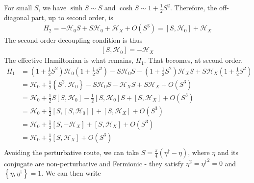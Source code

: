 For small \(S\), we have \(\sinh S \sim S\) and \(\cosh S \sim 1 + \frac{1}{2} S^2\). Therefore, the off-diagonal part, up to second order, is 
\begin{equation}\begin{aligned}
	H_2 = -\mathcal{H}_0 S + S \mathcal{H}_0 + \mathcal{H}_X + O(S^3) = \left[S,\mathcal{H}_0\right] + \mathcal{H}_X
\end{aligned}\end{equation}
The second order decoupling condition is thus
\begin{equation}\begin{aligned}
	\label{dec_cond}
	\left[S,\mathcal{H}_0\right] = -\mathcal{H}_X
\end{aligned}\end{equation}
The effective Hamiltonian is what remains, \(H_1\). That becomes, at second order,
\begin{equation}\begin{aligned}
	H_1 &= \left(1 + \frac{1}{2} S^2\right) \mathcal{H}_0 \left(1 + \frac{1}{2} S^2\right) - S \mathcal{H}_0 S -\left(1 + \frac{1}{2} S^2\right) \mathcal{H}_X S + S \mathcal{H}_X \left(1 + \frac{1}{2} S^2\right)\\
    &= \mathcal{H}_0 + \frac{1}{2} \left\{S^2, \mathcal{H}_0\right\} - S \mathcal{H}_0 S - \mathcal{H}_X S + S \mathcal{H}_X + O(S^3)\\
    &= \mathcal{H}_0 + \frac{1}{2} S\left[S, \mathcal{H}_0\right] - \frac{1}{2} \left[S, \mathcal{H}_0\right]S  + \left[S,\mathcal{H}_X\right] + O(S^3)\\
    &= \mathcal{H}_0 + \frac{1}{2} \left[S,\left[S, \mathcal{H}_0\right]\right] + \left[S,\mathcal{H}_X\right] + O(S^3)\\
    &= \mathcal{H}_0 + \frac{1}{2} \left[S,-\mathcal{H}_X\right] + \left[S,\mathcal{H}_X\right] + O(S^3)\\
    &= \mathcal{H}_0 + \frac{1}{2}\left[S,\mathcal{H}_X\right] + O(S^3)\\
\end{aligned}\end{equation}
Avoiding the perturbative route, we can take \(S = \frac{\pi}{4}\left(\eta^\dagger - \eta\right)\), where \(\eta\) and its conjugate are non-perturbative and Fermionic - they satisfy \(\eta^2 = {\eta^\dagger}^2 = 0\) and \(\left\{\eta,\eta^\dagger\right\}=1\). We can then write
